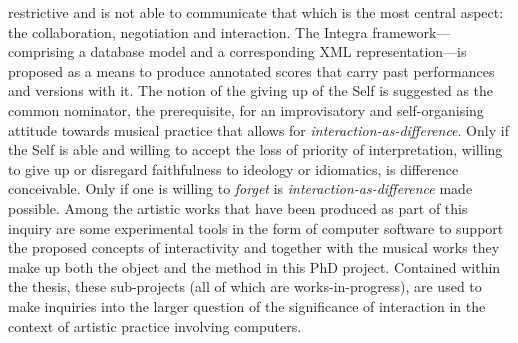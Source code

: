\documentclass[a4paper]{book}
\numberwithin{equation}{section}
\begin{document}
restrictive and is not able to communicate that which is the most central aspect: the
collaboration, negotiation and interaction. The Integra framework---comprising a database
model and a corresponding XML representation---is proposed as a means to produce annotated
scores that carry past performances and versions with it. The notion of the giving up of the
Self is suggested as the common nominator, the prerequisite, for an improvisatory
and self-organising attitude towards musical practice that allows for
\emph{interaction-as-difference}. Only if the
Self is able and willing to accept the loss of priority of interpretation,
willing to give up or disregard faithfulness to ideology or idiomatics, is difference
conceivable. Only if one is willing to \emph{forget} is \emph{interaction-as-difference} made possible. Among
the artistic works that have been produced as part of this inquiry are some experimental
tools in the form of computer software to support the proposed concepts of
interactivity and together with the musical works they make up both the object and the method
in this PhD project. Contained within the thesis, these sub-projects (all of which are
works-in-progress), are used to make inquiries into the larger question of the significance
of interaction in the context of artistic practice involving computers.

\end{document}
